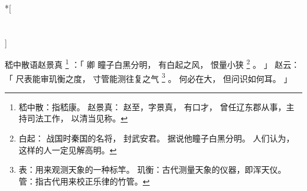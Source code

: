 
\switchcolumn[0]*[\section{}]

嵇中散语赵景真%
\footnote{%
    嵇中散：指嵇康。
    赵景真：
        赵至，字景真，
        有口才，
        曾任辽东郡从事，主持司法工作，
        以清当见称。
}%
：「
    卿
    瞳子白黑分明，
    有白起之风，
    恨量小狭%
    \footnote{%
        白起：
            战国时秦国的名将，
            封武安君。
            据说他瞳子白黑分明。
            人们认为，
            这样的人一定见解高明。
    }%
    。
」
赵云：「
    尺表能审玑衡之度，
    寸管能测往复之气%
    \footnote{%
        表：用来观测天象的一种标竿。
        玑衡：古代测量天象的仪器，即浑天仪。
        管：指古代用来校正乐律的竹管。
    }%
    。
    何必在大，
    但问识如何耳。
」

\switchcolumn



